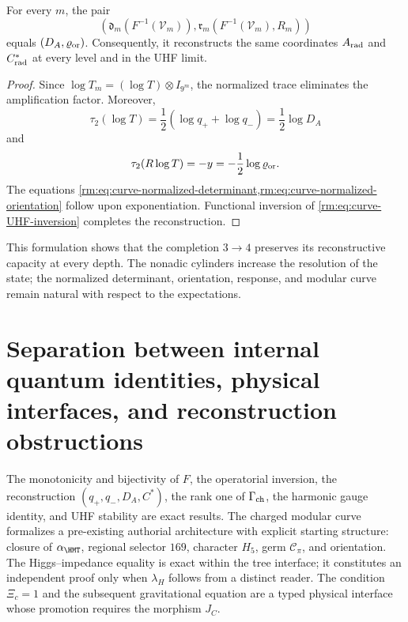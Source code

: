 \begin{proposition}
\label{rm:prop:curve-UHF-tomography}
For every \(m\), the pair
\begin{equation}
 \left(
 \mathfrak d_m(F^{-1}(\mathcal V_m)),
 \mathfrak r_m(F^{-1}(\mathcal V_m),R_m)
 \right)
 \label{rm:eq:curve-UHF-pair}
\end{equation}
equals \((D_A,\varrho_{\rm or})\). Consequently, it reconstructs the same coordinates \(A_{\rm rad}\) and \(C^*_{\rm rad}\) at every level and in the UHF limit.
\end{proposition}

\begin{proof}
Since
\(\log T_m=(\log T)\otimes I_{9^m}\), the normalized trace eliminates the
amplification factor. Moreover,
\[
 \tau_2(\log T)=\frac12(\log q_++\log q_-)=\frac12\log D_A
\]
and
\[
 \tau_2(R\log T)=-y=-\frac12\log\varrho_{\rm or}.
\]
The equations \cref{rm:eq:curve-normalized-determinant,rm:eq:curve-normalized-orientation}
follow upon exponentiation. Functional inversion of
\cref{rm:eq:curve-UHF-inversion} completes the reconstruction.
\end{proof}

This formulation shows that the completion \(3\to4\) preserves its
reconstructive capacity at every depth. The nonadic cylinders
increase the resolution of the state; the normalized determinant,
orientation, response, and modular curve remain natural with respect
to the expectations.

\section{Separation between internal quantum identities, physical interfaces, and reconstruction obstructions}

\begin{proofstatusbox}
The monotonicity and bijectivity of \(F\), the operatorial inversion, the
reconstruction \((q_+,q_-,D_A,C^*)\), the rank one of
\(\Gamma_{\rm ch}\), the harmonic gauge identity, and UHF stability
are exact results. The charged modular curve formalizes a pre-existing
authorial architecture with explicit starting structure: closure of
\(\alpha_{\HMT}\), regional selector \(169\), character \(H_5\), germ
\(\mathcal C_\pi\), and orientation. The
Higgs--impedance equality is exact within the tree interface; it constitutes an
independent proof only when \(\lambda_H\) follows from a distinct reader.
The condition \(\Xi_c=1\) and the subsequent gravitational equation
are a typed physical interface whose promotion requires the morphism \(J_C\).
\end{proofstatusbox}

